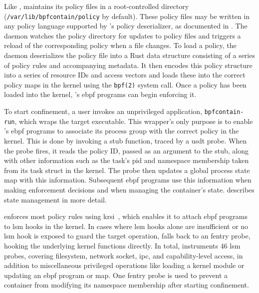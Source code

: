 Like \bpfbox{}, \bpfcontain{} maintains its policy files in a root-controlled directory
(\texttt{/var/lib/bpfcontain/policy} by default). These policy files may be written in any
policy language supported by \bpfcontain{}'s policy deserializer, as documented in
. The \bpfcontain{} daemon watches the policy directory for
updates to policy files and triggers a reload of the corresponding policy when a file
changes. To load a policy, the daemon deserializes the policy file into a Rust data
structure consisting of a series of policy rules and accompanying metadata. It then
encodes this policy structure into a series of resource IDs and access vectors and loads
these into the correct policy maps in the kernel using the \texttt{bpf(2)} system call.
Once a policy has been loaded into the kernel, \bpfcontain{}'s \gls{ebpf} programs can
begin enforcing it.

To start confinement, a user invokes an unprivileged application, \texttt{bpfcontain-run},
which wraps the target executable. This wrapper's only purpose is to enable
\bpfcontain{}'s \gls{ebpf} programs to associate its process group with the correct policy
in the kernel.  This is done by invoking a stub function, traced by a \gls{usdt} probe.
When the probe fires, it reads the policy ID, passed as an argument to the stub, along
with other information such as the task's \gls{pid} and namespace membership taken from
its task struct in the kernel. The probe then updates a global process state map with this
information. Subsequent \gls{ebpf} programs use this information when making enforcement
decisions and when managing the container's state.  describes
state management in more detail.

\bpfcontain{} enforces most policy rules using \gls{krsi}~\cite{singh2019_krsi}, which
enables it to attach \gls{ebpf} programs to \gls{lsm} hooks in the kernel. In cases where
\gls{lsm} hooks alone are insufficient or no \gls{lsm} hook is exposed to guard the target
operation, \bpfcontain{} falls back to an fentry probe, hooking the underlying kernel
functions directly. In total, \bpfcontain{} instruments 46 \gls{lsm} probes, covering
filesystem, network socket, \gls{ipc}, and capability-level access, in addition to
miscellaneous privileged operations like loading a kernel module or updating an \gls{ebpf}
program or map. One fentry probe is used to prevent a container from modifying its
namespace membership after starting confinement.

